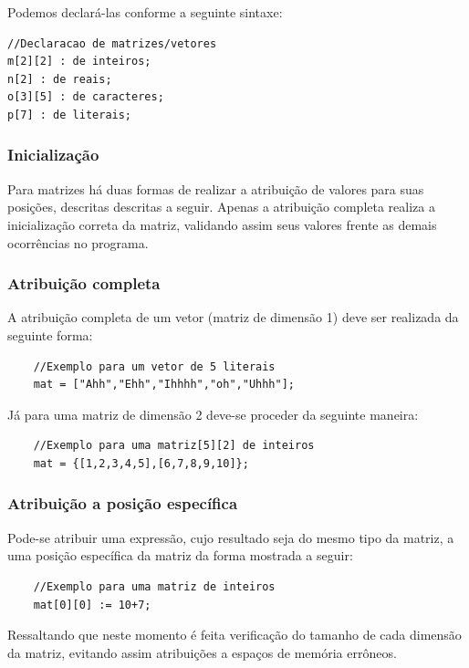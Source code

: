 \documentclass[a4paper,12pt]{report}
\begin{document}
Podemos declar\'a-las conforme a seguinte sintaxe:

\begin{verbatim}
//Declaracao de matrizes/vetores
m[2][2] : de inteiros;
n[2] : de reais;
o[3][5] : de caracteres;
p[7] : de literais;
\end{verbatim}

\subsubsection{Inicializa\c{c}\~ao}

Para matrizes h\'a duas formas de realizar a atribui\c{c}\~ao de valores para suas 
posi\c{c}\~oes, descritas descritas a seguir. Apenas a atribui\c{c}\~ao completa realiza
a inicializa\c{c}\~ao correta da matriz, validando assim seus valores frente as demais ocorr\^encias no programa.

\subsubsection{Atribui\c{c}\~ao completa}

A atribui\c{c}\~ao completa de um vetor (matriz de dimens\~ao 1) deve ser realizada da seguinte 
forma:

\begin{verbatim}
	//Exemplo para um vetor de 5 literais
	mat = ["Ahh","Ehh","Ihhhh","oh","Uhhh"];
\end{verbatim}

J\'a para uma matriz de dimens\~ao 2 deve-se proceder da seguinte maneira:

\begin{verbatim}
	//Exemplo para uma matriz[5][2] de inteiros
	mat = {[1,2,3,4,5],[6,7,8,9,10]};
\end{verbatim}

\subsubsection{Atribui\c{c}\~ao a posi\c{c}\~ao espec\'ifica}

Pode-se atribuir uma express\~ao, cujo resultado seja do mesmo tipo da matriz, a uma posi\c{c}\~ao espec\'ifica da matriz da forma mostrada a seguir:

\begin{verbatim}
	//Exemplo para uma matriz de inteiros
	mat[0][0] := 10+7;
\end{verbatim}

Ressaltando que neste momento \'e feita verifica\c{c}\~ao do tamanho de cada dimens\~ao da
matriz, evitando assim atribui\c{c}\~oes a espa\c{c}os de mem\'oria err\^oneos.
\end{document}
